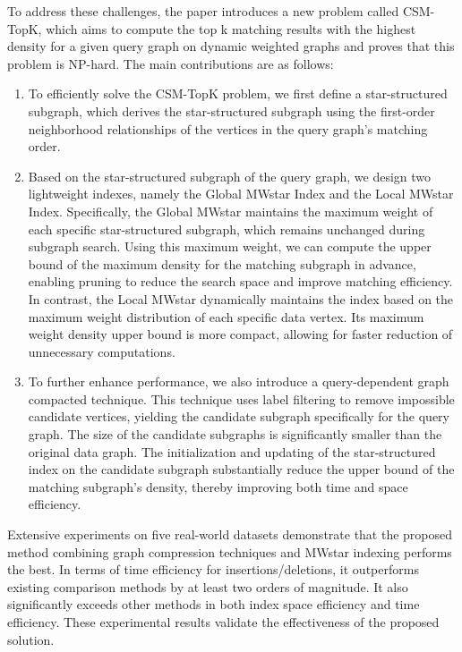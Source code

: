 \begin{enabstract}
	
	To address these challenges, the paper introduces a new problem called CSM-TopK, which aims to compute the top k matching results with the highest density for a given query graph on dynamic weighted graphs and proves that this problem is NP-hard. 
	The main contributions are as follows:
	\begin{enumerate}[label=(\arabic*)]  
		\item To efficiently solve the CSM-TopK problem, we first define a star-structured subgraph, which derives the star-structured subgraph using the first-order neighborhood relationships of the vertices in the query graph’s matching order.
		\item Based on the star-structured subgraph of the query graph, we design two lightweight indexes, namely the Global MWstar Index and the Local MWstar Index. 
		Specifically, the Global MWstar maintains the maximum weight of each specific star-structured subgraph, which remains unchanged during subgraph search. 
		Using this maximum weight, we can compute the upper bound of the maximum density for the matching subgraph in advance, enabling pruning to reduce the search space and improve matching efficiency. 
		In contrast, the Local MWstar dynamically maintains the index based on the maximum weight distribution of each specific data vertex. 
		Its maximum weight density upper bound is more compact, allowing for faster reduction of unnecessary computations.
		\item To further enhance performance, we also introduce a query-dependent graph compacted technique. 
		This technique uses label filtering to remove impossible candidate vertices, yielding the candidate subgraph specifically for the query graph. 
		The size of the candidate subgraphs is significantly smaller than the original data graph. 
		The initialization and updating of the star-structured index on the candidate subgraph substantially reduce the upper bound of the matching subgraph’s density, thereby improving both time and space efficiency.
		\end{enumerate}

		Extensive experiments on five real-world datasets demonstrate that the proposed method combining graph compression techniques and MWstar indexing performs the best. 
		In terms of time efficiency for insertions/deletions, it outperforms existing comparison methods by at least two orders of magnitude. 
		It also significantly exceeds other methods in both index space efficiency and time efficiency. 
		These experimental results validate the effectiveness of the proposed solution.
\end{enabstract}